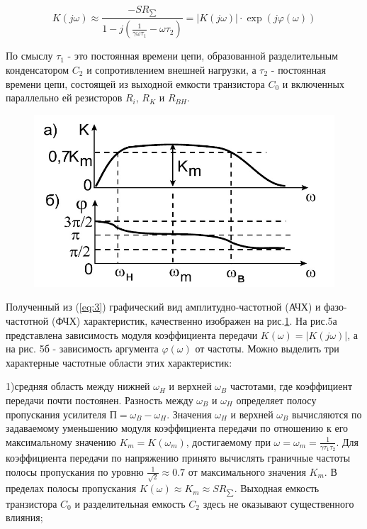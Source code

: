 \begin{equation}
	K(j\omega) \approx \frac{-SR_{\sum}}{1-j(\frac{1}{\gamma \omega \tau_1}-\omega \tau_2)}=|K(j \omega)| \cdot \exp(j \varphi(\omega))
	\label{eq:3}
\end{equation}

По смыслу $\tau_1$ - это постоянная времени цепи, образованной разделительным конденсатором $C_2$ и сопротивлением внешней нагрузки, а $\tau_2$ - постоянная времени цепи, состоящей из выходной емкости транзистора $C_0$ и включенных параллельно ей  резисторов $R_i$, $R_K$ и $R_{BH}$.

\begin{figure}[h!]
	\centering
	\includegraphics[width=0.6\linewidth]{fig/fig5}
	\caption{}
	\label{fig:5}
\end{figure}

Полученный из (\ref{eq:3}) графический вид амплитудно-частотной (АЧХ) и фазо-частотной (ФЧХ) характеристик, качественно изображен на рис.\ref{fig:5}. На рис.5а представлена зависимость модуля коэффициента передачи $K(\omega) = |K(j\omega)|$, а на рис. 5б - зависимость аргумента $\varphi(\omega)$ от частоты. Можно выделить три характерные
частотные области этих характеристик:

1)средняя область между нижней $\omega_H$ и верхней $\omega_B$ частотами, где коэффициент передачи почти постоянен. Разность между $\omega_B$ и $\omega_H$ определяет полосу пропускания усилителя $\text{П}=\omega_B - \omega_H$. Значения $\omega_H$ и верхней $\omega_B$ вычисляются по задаваемому уменьшению модуля коэффициента передачи по отношению к его максимальному значению $K_m=K(\omega_m)$, достигаемому при $\omega=\omega_m=\frac{1}{\gamma \tau_1 \tau_2}$. Для коэффициента передачи по напряжению принято вычислять граничные частоты полосы пропускания по уровню $\frac{1}{\sqrt{2}} \approx 0.7$ от максимального значения $K_m$. В пределах полосы пропускания $K(\omega) \approx K_m \approx SR_{\sum}$. Выходная емкость транзистора $C_0$ и разделительная емкость $C_2$ здесь не оказывают существенного влияния; 


